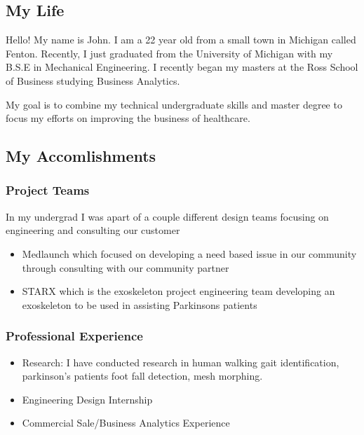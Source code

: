 \documentclass[
]{book}
\providecommand{\tightlist}{%
  \setlength{\itemsep}{0pt}\setlength{\parskip}{0pt}}
\begin{document}
\hypertarget{my-life}{%
\subsection{My Life}\label{my-life}}

Hello! My name is John. I am a 22 year old from a small town in Michigan called Fenton. Recently, I just graduated from the University of Michigan with my B.S.E in Mechanical Engineering. I recently began my masters at the Ross School of Business studying Business Analytics.

My goal is to combine my technical undergraduate skills and master degree to focus my efforts on improving the business of healthcare.

\hypertarget{my-accomlishments}{%
\subsection{My Accomlishments}\label{my-accomlishments}}

\hypertarget{project-teams}{%
\subsubsection{Project Teams}\label{project-teams}}

In my undergrad I was apart of a couple different design teams focusing on engineering and consulting our customer

\begin{itemize}
\tightlist
\item
  Medlaunch which focused on developing a need based issue in our community through consulting with our community partner
\item
  STARX which is the exoskeleton project engineering team developing an exoskeleton to be used in assisting Parkinsons patients
\end{itemize}

\hypertarget{professional-experience}{%
\subsubsection{Professional Experience}\label{professional-experience}}

\begin{itemize}
\item
  Research: I have conducted research in human walking gait identification, parkinson's patients foot fall detection, mesh morphing.
\item
  Engineering Design Internship
\item
  Commercial Sale/Business Analytics Experience
\end{itemize}
\end{document}
